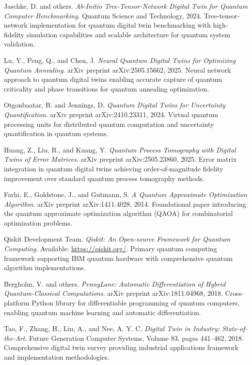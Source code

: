 \documentclass[12pt,a4paper]{article}
\begin{document}
\begin{thebibliography}{99}

Jaschke, D. and others.
\textit{Ab-Initio Tree-Tensor-Network Digital Twin for Quantum Computer Benchmarking}.
Quantum Science and Technology, 2024.
Tree-tensor-network implementation for quantum digital twin benchmarking with high-fidelity simulation capabilities and scalable architecture for quantum system validation.

Lu, Y., Peng, Q., and Chen, J.
\textit{Neural Quantum Digital Twins for Optimizing Quantum Annealing}.
arXiv preprint arXiv:2505.15662, 2025.
Neural network approach to quantum digital twins enabling accurate capture of quantum criticality and phase transitions for quantum annealing optimization.

Otgonbaatar, B. and Jennings, D.
\textit{Quantum Digital Twins for Uncertainty Quantification}.
arXiv preprint arXiv:2410.23311, 2024.
Virtual quantum processing units for distributed quantum computation and uncertainty quantification in quantum systems.

Huang, Z., Liu, R., and Kuang, Y.
\textit{Quantum Process Tomography with Digital Twins of Error Matrices}.
arXiv preprint arXiv:2505.23860, 2025.
Error matrix integration in quantum digital twins achieving order-of-magnitude fidelity improvement over standard quantum process tomography methods.

Farhi, E., Goldstone, J., and Gutmann, S.
\textit{A Quantum Approximate Optimization Algorithm}.
arXiv preprint arXiv:1411.4028, 2014.
Foundational paper introducing the quantum approximate optimization algorithm (QAOA) for combinatorial optimization problems.

Qiskit Development Team.
\textit{Qiskit: An Open-source Framework for Quantum Computing}.
Available: \url{https://qiskit.org/}.
Primary quantum computing framework supporting IBM quantum hardware with comprehensive quantum algorithm implementations.

Bergholm, V. and others.
\textit{PennyLane: Automatic Differentiation of Hybrid Quantum-Classical Computations}.
arXiv preprint arXiv:1811.04968, 2018.
Cross-platform Python library for differentiable programming of quantum computers, enabling quantum machine learning and automatic differentiation.

Tao, F., Zhang, H., Liu, A., and Nee, A. Y. C.
\textit{Digital Twin in Industry: State-of-the-Art}.
Future Generation Computer Systems, Volume 83, pages 441--462, 2018.
Comprehensive digital twin survey providing industrial applications framework and implementation methodologies.


\end{thebibliography}
\end{document}
